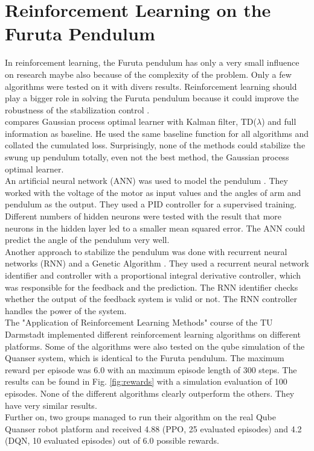 \section{Reinforcement Learning on the Furuta Pendulum}
In reinforcement learning, the Furuta pendulum has only a very small influence 
on research maybe also because of the complexity of the 
problem. Only a few algorithms were tested on it with divers results. 
Reinforcement learning should play a bigger role in solving the Furuta pendulum 
because it could improve the robustness of the stabilization control 
\citep{wang2004minimum}.\\
\cite{hennig2011optimal} compares Gaussian process optimal learner with 
Kalman filter, TD($\lambda$) and full information as baseline. He used the same 
baseline function for all algorithms and collated the cumulated loss. 
Surprisingly, none of the methods could stabilize the swung up pendulum 
totally, even not the best method, the Gaussian process optimal learner.\\
An artificial neural network (ANN) was used to model the pendulum 
\citep{quyen2012rotary}. They worked with the voltage of the motor as input 
values and the angles of arm and pendulum as the output. They used a PID 
controller for a supervised training. Different numbers of 
hidden neurons were tested with the result that more neurons in the hidden 
layer led to a smaller mean squared error. The ANN could predict the angle of 
the pendulum very well.\\
Another approach to stabilize the pendulum was done with recurrent neural 
networks (RNN) and a Genetic Algorithm 
\citep{shojaei2011hybrid}. They used a recurrent neural network identifier and 
controller with a proportional integral derivative controller, which was 
responsible for the feedback and the prediction. The RNN identifier checks 
whether the output of the feedback system is valid or not. The RNN controller 
handles the power of the system.\\
The "Application of Reinforcement Learning Methods" course of the TU Darmstadt 
implemented different reinforcement learning algorithms on different platforms. 
Some of the algorithms were also tested on the qube simulation of the Quanser 
system, which is identical to the Furuta pendulum. The maximum reward per 
episode was 6.0 with an maximum episode length of 300 steps. The results can be 
found in Fig. \ref{fig:rewards} with a simulation evaluation of 100 episodes. 
None of the different algorithms clearly outperform the others. They have very 
similar results.\\
Further on, two groups managed to run their algorithm on the real Qube Quanser 
robot platform and received 4.88 (PPO, 25 evaluated episodes) and 4.2 (DQN, 10 
evaluated episodes) out of 6.0 possible rewards.  

